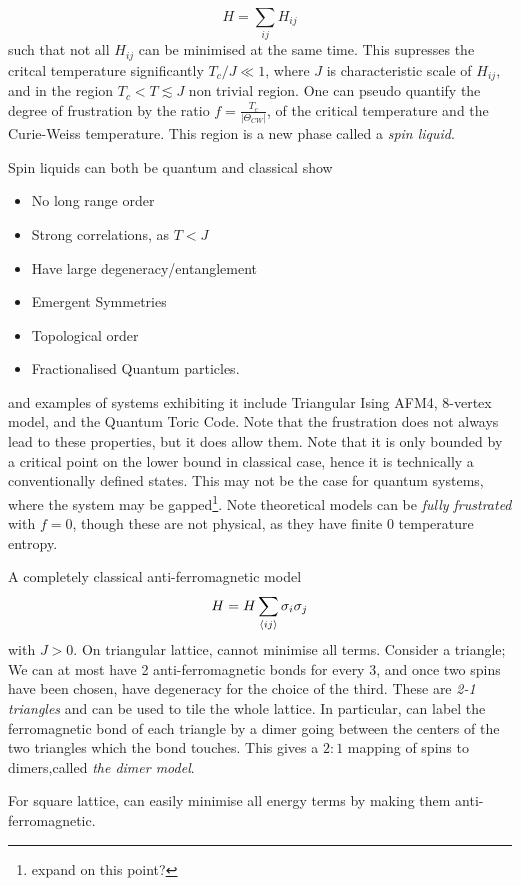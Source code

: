\documentclass[a4paper]{article}
\begin{document}
\[ H=\sum_{ij}H_{ij}\]
such that not all $H_{ij}$ can be minimised at the same time.
This supresses the critcal temperature significantly $T_c/J\ll 1$, where $J$ is
characteristic scale of $H_{ij}$, and in the
region $T_c<T\lesssim J$ non trivial region. One can pseudo quantify the degree
of frustration by the ratio $f=\frac{T_c}{|\Theta_{CW}|}$, of the critical
temperature and the Curie-Weiss temperature. This region is a new phase called a \emph{spin
liquid}.
\begin{remark}
    Spin liquids can both be quantum and classical show 
    \begin{itemize}
        \item No long range order
        \item Strong correlations, as $T<J$
        \item Have large degeneracy/entanglement
        \item Emergent Symmetries
        \item Topological order
        \item Fractionalised Quantum particles.
    \end{itemize}
    and examples of systems exhibiting it include Triangular Ising AFM4, 8-vertex
    model, and the Quantum Toric Code. Note that the frustration does not always
    lead to these properties, but it does allow them. 
    Note that it is only bounded by a critical point on the lower bound in classical
    case, hence it is technically a conventionally defined states. This may not
    be the case for quantum systems, where the system may be
    gapped\footnote{expand on this point?}. Note theoretical models can be
    \emph{fully frustrated} with $f=0$, though these are not physical, as they
    have finite 0 temperature entropy.
\end{remark}
\begin{example}
    A completely classical anti-ferromagnetic model 
    \[ H= H\sum_{\braket{ij}}\sigma_i\sigma_j\]
    with $J>0$. On triangular lattice, cannot minimise all terms. Consider
    a triangle; We can at most have 2 anti-ferromagnetic bonds for every 3, and
    once two spins have been chosen, have degeneracy for the choice of the
    third. These are \emph{2-1 triangles} and can be used to tile the whole
    lattice. In particular, can label the ferromagnetic bond of each triangle by
    a dimer going between the centers of the two triangles which the bond
    touches. This gives a $2:1$ mapping of spins to dimers,called \emph{the
    dimer model}.
    \begin{remark}
    For square lattice, can easily minimise all energy terms by making them
    anti-ferromagnetic.
    \end{remark}
\end{example}
\end{document}
